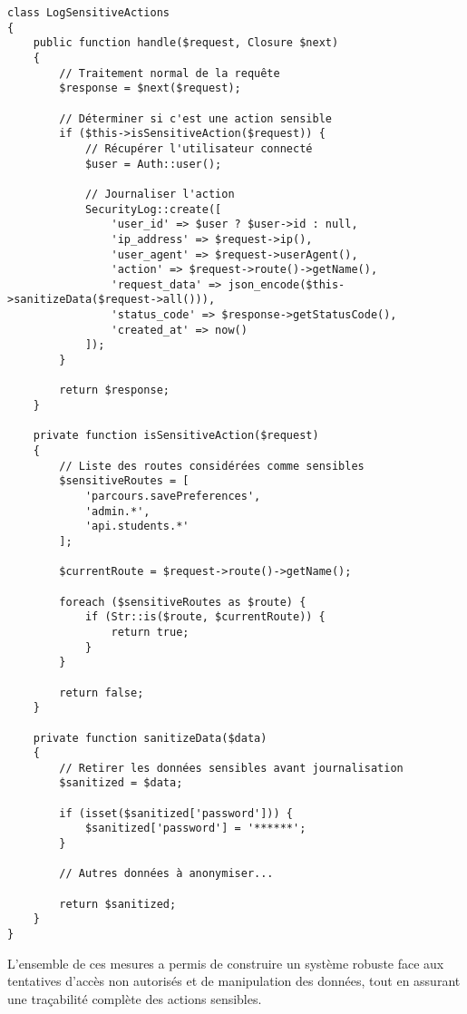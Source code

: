 \documentclass[french,12pt]{report} %
\begin{document}
\begin{lstlisting}[style=phpstyle,caption={Middleware de journalisation des actions sensibles}]
class LogSensitiveActions
{
    public function handle($request, Closure $next)
    {
        // Traitement normal de la requête
        $response = $next($request);
        
        // Déterminer si c'est une action sensible
        if ($this->isSensitiveAction($request)) {
            // Récupérer l'utilisateur connecté
            $user = Auth::user();
            
            // Journaliser l'action
            SecurityLog::create([
                'user_id' => $user ? $user->id : null,
                'ip_address' => $request->ip(),
                'user_agent' => $request->userAgent(),
                'action' => $request->route()->getName(),
                'request_data' => json_encode($this->sanitizeData($request->all())),
                'status_code' => $response->getStatusCode(),
                'created_at' => now()
            ]);
        }
        
        return $response;
    }
    
    private function isSensitiveAction($request)
    {
        // Liste des routes considérées comme sensibles
        $sensitiveRoutes = [
            'parcours.savePreferences',
            'admin.*',
            'api.students.*'
        ];
        
        $currentRoute = $request->route()->getName();
        
        foreach ($sensitiveRoutes as $route) {
            if (Str::is($route, $currentRoute)) {
                return true;
            }
        }
        
        return false;
    }
    
    private function sanitizeData($data)
    {
        // Retirer les données sensibles avant journalisation
        $sanitized = $data;
        
        if (isset($sanitized['password'])) {
            $sanitized['password'] = '******';
        }
        
        // Autres données à anonymiser...
        
        return $sanitized;
    }
}
\end{lstlisting}

L'ensemble de ces mesures a permis de construire un système robuste face aux tentatives d'accès non autorisés et de manipulation des données, tout en assurant une traçabilité complète des actions sensibles.
\end{document}
